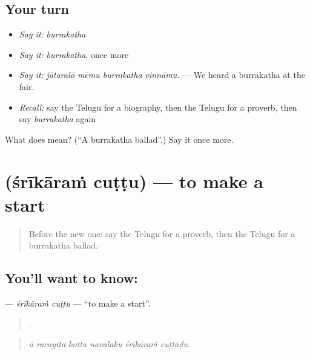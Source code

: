 \subsection*{Your turn}
\begin{itemize}
\raggedright
  \item \emph{Say it:} \emph{burrakatha}
  \item \emph{Say it:} \emph{burrakatha}, once more
  \item \emph{Say it:} \emph{jātaralō mēmu burrakatha vinnāmu.} — We heard a burrakatha at the fair.
  \item \emph{Recall:} say the Telugu for a biography, then the Telugu for a proverb, then say \emph{burrakatha} again
\end{itemize}

\begin{tcolorbox}[breakable,colback=teal!4,colframe=teal!35!black,title={Before you move on}]
What does  mean? (\textquotedblleft{}A burrakatha ballad\textquotedblright{}.) Say it once more.
\end{tcolorbox}
\section[\texorpdfstring{\te{శ్రీకారం} \te{చుట్టు} (śrīkāraṁ cuṭṭu)}{శ్రీకారం చుట్టు (śrīkāraṁ cuṭṭu)}]{  (śrīkāraṁ cuṭṭu) — to make a start}

\label{lesson:TE-C373-srikaram-cuttu}



\begin{quote}
Before the new one: say the Telugu for a proverb, then the Telugu for a burrakatha ballad.
\end{quote}

\subsection*{You'll want to know:  }
\textbf{ } — \emph{śrīkāraṁ cuṭṭu} — \textquotedblleft{}to make a start\textquotedblright{}.

\begin{quote}
     .
\end{quote}

\begin{quote}
\emph{ā racayita kotta navalaku śrīkāraṁ cuṭṭāḍu.}
\end{quote}

